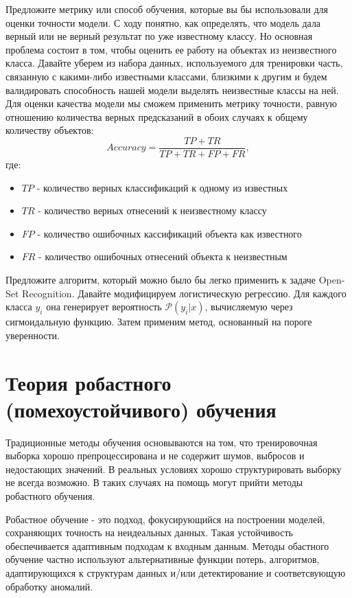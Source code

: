 \problem Предложите метрику или способ обучения, которые вы бы использовали для оценки точности модели.
\solution С ходу понятно, как определять, что модель дала верный или не верный результат по уже известному классу.
Но основная проблема состоит в том, чтобы оценить ее работу на объектах из неизвестного класса.
Давайте уберем из набора данных, используемого для тренировки часть, связанную с какими-либо известными классами, близкими к другим и будем валидировать способность нашей модели выделять неизвестные классы на ней.
Для оценки качества модели мы сможем применить метрику точности, равную отношению количества верных предсказаний в обоих случаях к общему количеству объектов:
$$Accuracy = \frac{TP + TR}{TP + TR + FP + FR},$$
где:
\begin{itemize}
    \item $TP$ - количество верных классификаций к одному из известных
    \item $TR$ - количество верных отнесений к неизвестному классу
    \item $FP$ - количество ошибочных кассификаций объекта как известного
    \item $FR$ - количество ошибочных отнесений объекта к неизвестным
\end{itemize}

\problem Предложите алгоритм, который можно было бы легко применить к задаче Open-Set Recognition.
\solution Давайте модифицируем логистическую регрессию. Для каждого класса $y_i$ она генерирует вероятность $\mathcal{P}(y_i|x)$, вычисляемую через сигмоидальную функцию.
Затем применим метод, основанный на пороге уверенности.

\section{Теория робастного (помехоустойчивого) обучения}
Традиционные методы обучения основываются на
том, что тренировочная выборка хорошо препроцессирована и не содержит шумов,
выбросов и недостающих значений. В реальных условиях хорошо структурировать
выборку не всегда возможно. В таких случаях на помощь могут прийти методы
робастного обучения.

Робастное обучение - это подход, фокусирующийся на построении моделей,
сохраняющих точность на неидеальных данных. Такая устойчивость обеспечивается
адаптивным подходам к входным данным. Методы обастного обучение частно
используют альтернативные функции потерь, алгоритмов, адаптирующихся к
структурам данных и/или детектирование и соответсвующую обработку аномалий.

